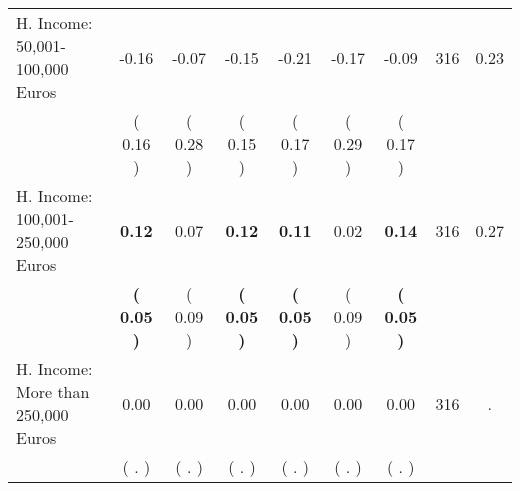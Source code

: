 \begin{tabular}{lcccccccc}
H. Income: 50,001-100,000 Euros &     -0.16 &     -0.07 &     -0.15 &     -0.21 &     -0.17 &     -0.09 & 316 &       0.23 \\ 
 & (     0.16 ) & (     0.28 ) & (     0.15 ) & (     0.17 ) & (     0.29 ) & (     0.17 ) & \\
H. Income: 100,001-250,000 Euros & \textbf{     0.12} &      0.07 & \textbf{     0.12} & \textbf{     0.11} &      0.02 & \textbf{     0.14} & 316 &       0.27 \\ 
 & \textbf{(     0.05 )} & (     0.09 ) & \textbf{(     0.05 )} & \textbf{(     0.05 )} & (     0.09 ) & \textbf{(     0.05 )} & \\
H. Income: More than 250,000 Euros &      0.00 &      0.00 &      0.00 &      0.00 &      0.00 &      0.00 & 316 &          . \\ 
 & (        . ) & (        . ) & (        . ) & (        . ) & (        . ) & (        . ) & \\
\bottomrule
\end{tabular}
